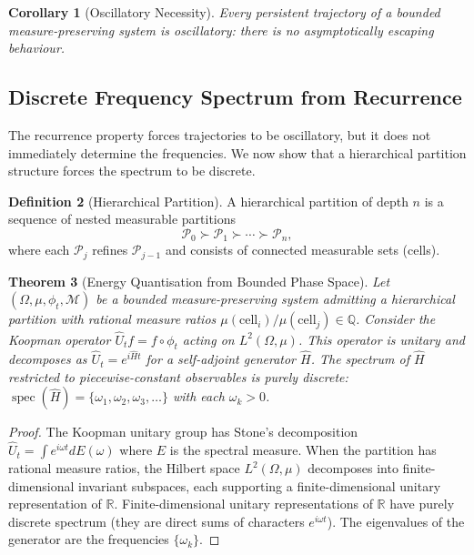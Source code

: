 \documentclass[11pt,twocolumn,a4paper]{article}
\newtheorem{theorem}{Theorem}[section]
\newtheorem{corollary}[theorem]{Corollary}
\theoremstyle{definition}
\newtheorem{definition}[theorem]{Definition}
\DeclareMathOperator{\spec}{spec}
\newcommand{\calP}{\mathcal{P}}
\newcommand{\calM}{\mathcal{M}}
\begin{document}
\begin{corollary}[Oscillatory Necessity]
\label{cor:oscillatory}
Every persistent trajectory of a bounded measure-preserving system is oscillatory: there is no asymptotically escaping behaviour.
\end{corollary}

\subsection{Discrete Frequency Spectrum from Recurrence}

The recurrence property forces trajectories to be oscillatory, but it does not immediately determine the frequencies. We now show that a hierarchical partition structure forces the spectrum to be discrete.

\begin{definition}[Hierarchical Partition]
A hierarchical partition of depth $n$ is a sequence of nested measurable partitions
\[
\calP_0 \succ \calP_1 \succ \cdots \succ \calP_n,
\]
where each $\calP_j$ refines $\calP_{j-1}$ and consists of connected measurable sets (cells).
\end{definition}

\begin{theorem}[Energy Quantisation from Bounded Phase Space]
\label{thm:quantisation}
Let $(\Omega, \mu, \phi_t, \calM)$ be a bounded measure-preserving system admitting a hierarchical partition with rational measure ratios $\mu(\text{cell}_i)/\mu(\text{cell}_j) \in \mathbb{Q}$. Consider the Koopman operator $\hat{U}_t f = f \circ \phi_t$ acting on $L^2(\Omega, \mu)$. This operator is unitary and decomposes as $\hat{U}_t = e^{i\hat{H}t}$ for a self-adjoint generator $\hat{H}$. The spectrum of $\hat{H}$ restricted to piecewise-constant observables is purely discrete: $\spec(\hat{H}) = \{\omega_1, \omega_2, \omega_3, \ldots\}$ with each $\omega_k > 0$.
\end{theorem}

\begin{proof}
The Koopman unitary group has Stone's decomposition $\hat{U}_t = \int e^{i\omega t} dE(\omega)$ where $E$ is the spectral measure. When the partition has rational measure ratios, the Hilbert space $L^2(\Omega,\mu)$ decomposes into finite-dimensional invariant subspaces, each supporting a finite-dimensional unitary representation of $\mathbb{R}$. Finite-dimensional unitary representations of $\mathbb{R}$ have purely discrete spectrum (they are direct sums of characters $e^{i\omega t}$). The eigenvalues of the generator are the frequencies $\{\omega_k\}$.
\end{proof}
\end{document}
